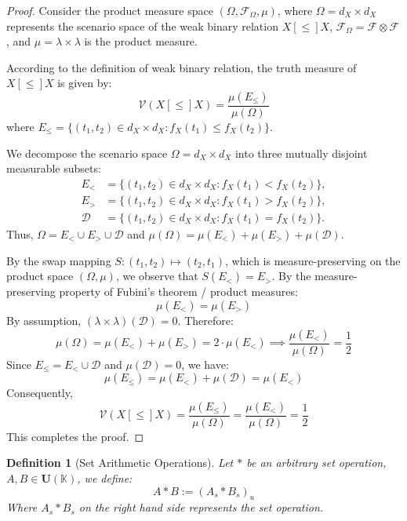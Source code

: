 \documentclass[a4paper,12pt,twoside]{memoir}
\newtheorem{definition}{Definition}[chapter]
\newcommand{\ddclmd}{\mathcal{V}} %
\begin{document}
	\begin{proof}
		Consider the product measure space $(\Omega, \mathcal{F}_{\Omega}, \mu)$, where $\Omega = d_X \times d_X$ represents the scenario space of the weak binary relation $X [\le] X$, $\mathcal{F}_{\Omega} = \mathcal{F} \otimes \mathcal{F}$, and $\mu = \lambda \times \lambda$ is the product measure.
		
		According to the definition of weak binary relation, the truth measure of $X [\le] X$ is given by:
		\[
		\ddclmd(X [\le] X) = \frac{\mu(E_{\le})}{\mu(\Omega)}
		\]
		where $E_{\le} = \{(t_1, t_2) \in d_X \times d_X : f_X(t_1) \le f_X(t_2)\}$.
		
		We decompose the scenario space $\Omega = d_X \times d_X$ into three mutually disjoint measurable subsets:
		\begin{align*}
			E_{<}       & = \{(t_1, t_2) \in d_X \times d_X : f_X(t_1) < f_X(t_2)\},  \\
			E_{>}       & = \{(t_1, t_2) \in d_X \times d_X : f_X(t_1) > f_X(t_2)\},  \\
			\mathcal{D} & = \{(t_1, t_2) \in d_X \times d_X : f_X(t_1) = f_X(t_2)\}.
		\end{align*}
		Thus, $\Omega = E_{<} \cup E_{>} \cup \mathcal{D}$ and $\mu(\Omega) = \mu(E_{<}) + \mu(E_{>}) + \mu(\mathcal{D})$.
		
		By the swap mapping $S: (t_1, t_2) \mapsto (t_2, t_1)$, which is measure-preserving on the product space $(\Omega, \mu)$, we observe that $S(E_{<}) = E_{>}$. By the measure-preserving property of Fubini's theorem / product measures:
		\[
		\mu(E_{<}) = \mu(E_{>})
		\]
		By assumption, $(\lambda \times \lambda)(\mathcal{D}) = 0$. Therefore:
		\[
		\mu(\Omega) = \mu(E_{<}) + \mu(E_{>}) = 2 \cdot \mu(E_{<}) \implies \frac{\mu(E_{<})}{\mu(\Omega)} = \frac{1}{2}
		\]
		Since $E_{\le} = E_{<} \cup \mathcal{D}$ and $\mu(\mathcal{D}) = 0$, we have:
		\[
		\mu(E_{\le}) = \mu(E_{<}) + \mu(\mathcal{D}) = \mu(E_{<})
		\]
		Consequently,
		\[
		\ddclmd(X [\le] X) = \frac{\mu(E_{\le})}{\mu(\Omega)} = \frac{\mu(E_{<})}{\mu(\Omega)} = \frac{1}{2}
		\]
		This completes the proof.
	\end{proof}
	
	\begin{definition}[Set Arithmetic Operations]
		Let $*$ be an arbitrary set operation, $A, B \in \mathbf{U}(\mathbb{K})$, we define:
		\[
		A * B := (A_s * B_s)_u
		\]
		Where $A_s * B_s$ on the right hand side represents the set operation.
	\end{definition}
	
\end{document}
